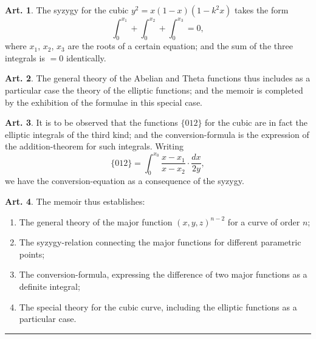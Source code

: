 \documentclass[12pt,a4paper]{article}
\theoremstyle{definition}
\newtheorem{art}{Art.}[section]
\begin{document}
\newpage
\begin{art}\label{art:127}
The syzygy for the cubic $y^2 = x(1-x)(1-k^2x)$ takes the form
\[
\int_0^{x_1} + \int_0^{x_2} + \int_0^{x_3} = 0,
\]
where $x_1$, $x_2$, $x_3$ are the roots of a certain equation; and the sum of the three integrals is $= 0$ identically.
\end{art}

\begin{art}\label{art:128}
The general theory of the Abelian and Theta functions thus includes as a particular case the theory of the elliptic functions; and the memoir is completed by the exhibition of the formulae in this special case.
\end{art}

\begin{art}\label{art:129}
It is to be observed that the functions $\{012\}$ for the cubic are in fact the elliptic integrals of the third kind; and the conversion-formula is the expression of the addition-theorem for such integrals. Writing
\[
\{012\} = \int_0^{x_0} \frac{x - x_1}{x - x_2} \cdot \frac{dx}{2y},
\]
we have the conversion-equation as a consequence of the syzygy.
\end{art}

\begin{art}\label{art:130}
The memoir thus establishes:
\begin{enumerate}
\item The general theory of the major function $(x, y, z)^{n-2}$ for a curve of order $n$;
\item The syzygy-relation connecting the major functions for different parametric points;
\item The conversion-formula, expressing the difference of two major functions as a definite integral;
\item The special theory for the cubic curve, including the elliptic functions as a particular case.
\end{enumerate}
\end{art}

\vspace{1cm}
\begin{center}
\rule{0.5\textwidth}{0.4pt}
\end{center}
\end{document}
